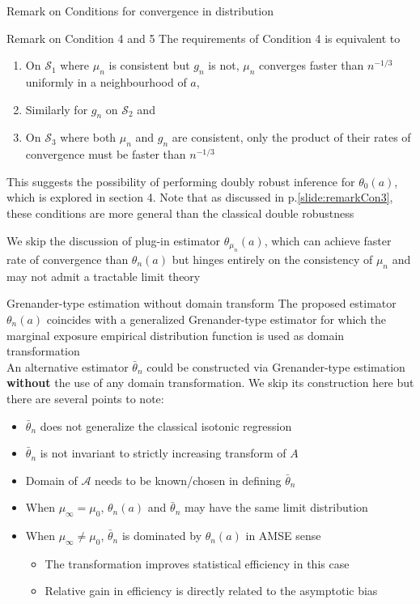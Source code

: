 \documentclass{beamer}
\newcommand{\vs}[1]{\vspace{#1 cm}}
\begin{document}
\begin{frame}{Remark on Conditions for convergence in distribution}
  \begin{block}{Remark on Condition 4 and 5}
    The requirements of Condition 4 is equivalent to
    \begin{enumerate}
      \item On $\mathcal{S}_1$ where $\mu_n$ is consistent but $g_n$ is not, $\mu_n$ converges faster than $n^{-1/3}$ uniformly in a neighbourhood of $a$,
      \item Similarly for $g_n$ on $\mathcal{S}_2$ and
      \item On $\mathcal{S}_3$ where both $\mu_n$ and $g_n$ are consistent, only the product of their rates of convergence must be faster than $n^{-1/3}$
    \end{enumerate}
    This suggests the possibility of performing doubly robust inference for $\theta_0(a)$, which is explored in section 4.
    Note that as discussed in p.\ref{slide:remarkCon3}, these conditions are more general than the classical double robustness
  \end{block}
  We skip the discussion of plug-in estimator $\theta_{\mu_n}(a)$, which can achieve faster rate of convergence than $\theta_n(a)$ but hinges entirely on the consistency of $\mu_n$ and may not admit a tractable limit theory
\end{frame}

\begin{frame}{Grenander-type estimation without domain transform}
  The proposed estimator $\theta_n(a)$ coincides with a generalized Grenander-type estimator for which the marginal exposure empirical distribution function is used as domain transformation \\
  \vs{0.3}
  An alternative estimator $\bar{\theta}_n$ could be constructed via Grenander-type estimation \textbf{without} the use of any domain transformation. We skip its construction here but there are several points to note:
  \begin{itemize}
    \item $\bar{\theta}_n$ does not generalize the classical isotonic regression
    \item $\bar{\theta}_n$ is not invariant to strictly increasing transform of $A$
    \item Domain of $\mathcal{A}$ needs to be known/chosen in defining $\bar{\theta}_n$
    \item When $\mu_\infty = \mu_0$, $\theta_n(a)$ and $\bar{\theta}_n$ may have the same limit distribution
    \item When $\mu_\infty \neq \mu_0$, $\bar{\theta}_n$ is dominated by $\theta_n(a)$ in AMSE sense
    \begin{itemize}
      \item The transformation improves statistical efficiency in this case
      \item Relative gain in efficiency is directly related to the asymptotic bias
    \end{itemize}
  \end{itemize}
\end{frame}
\end{document}
